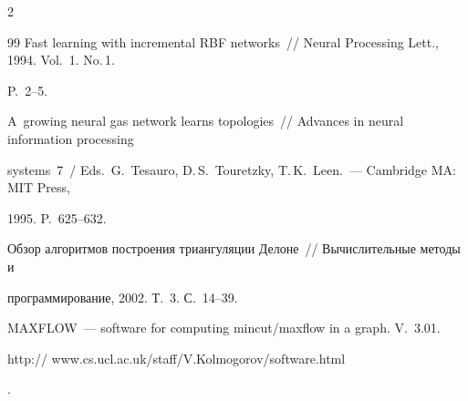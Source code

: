 \begin{multicols}{2}
{{\begin{thebibliography}{99}
Fast learning with incremental RBF networks~// Neural Processing Lett., 1994. Vol.~1. No.\,1. 

P.~2--5.





A~growing neural gas network learns topologies~// Advances in neural information processing 

systems~7~/ Eds.\ G.~Tesauro, D.\,S.~Touretzky, T.\,K.~Leen.~--- Cambridge MA: MIT Press, 

1995. P.~625--632.







Обзор алгоритмов построения триангуляции Делоне~// Вычислительные методы и 

программирование, 2002. Т.~3. С.~14--39.



\label{end\stat}





MAXFLOW~--- software for computing mincut/maxflow in a graph. V.~3.01. {\sf 

http:// www.cs.ucl.ac.uk/staff/V.Kolmogorov/software.html}.

 \end{thebibliography}

}

}





\end{multicols}

